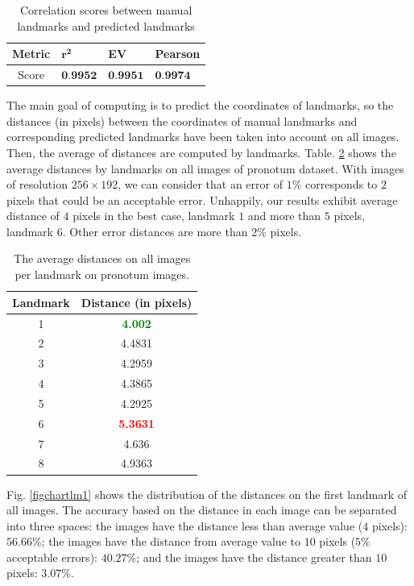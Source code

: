 \documentclass[review]{elsarticle}
\begin{document}
\begin{table}[htbp]
	\centering
	\begin{tabular}{|c|p{2cm}|p{2cm}|p{2cm}|}
		Metric & $\mathbf{r^{2}}$ & \textbf{EV} & \textbf{Pearson} \\ \hline
		Score & $\textbf{0.9952}$ & $\textbf{0.9951}$ & $\textbf{0.9974}$ 
	\end{tabular}
	\caption{Correlation scores between manual landmarks and predicted landmarks}
	\label{tblcorrelation}
\end{table}

The main goal of computing is to predict the coordinates of landmarks, so the distances (in pixels) between the coordinates of manual landmarks and corresponding predicted landmarks have been taken into account on all images. Then, the average of distances are computed by landmarks. Table. \ref{tblavgpronotum} shows the average distances by landmarks on all images of pronotum dataset. With images of resolution $256 \times 192$, we can
consider that an error of $1\%$ corresponds to $2$ pixels that could
be an acceptable error. Unhappily, our results exhibit average
distance of $4$ pixels in the best case, landmark $1$ and more than
$5$ pixels, landmark $6$. Other error distances are more than $2\%$
pixels.

\begin{table}[htbp]
	\centering	
	\begin{tabular}{|c|c|}
		\hline
		\textbf{Landmark} & \textbf{Distance} (in pixels) \\ \hline
		1 & \textcolor{green}{\textbf{4.002}}  \\ \hline
		2 & 4.4831 \\ \hline
		3 & 4.2959 \\ \hline
		4 & 4.3865 \\ \hline
		5 & 4.2925 \\ \hline
		6 & \textcolor{red}{\textbf{5.3631}} \\ \hline
		7 & 4.636 \\ \hline
		8 & 4.9363 \\ \hline
	\end{tabular}
	\caption{The average distances on all images per landmark on pronotum images.}
	\label{tblavgpronotum}
\end{table}

Fig. \ref{figchartlm1} shows the distribution of the distances on the first landmark of all images. The accuracy based on the distance in each image can be
separated into three spaces: the images have the distance less
than average value ($4$ pixels): $56.66\%$; the images have the
distance from average value to $10$ pixels ($5\%$ acceptable errors): $40.27\%$; and the images have the distance
greater than $10$ pixels: $3.07\%$.
\end{document}
